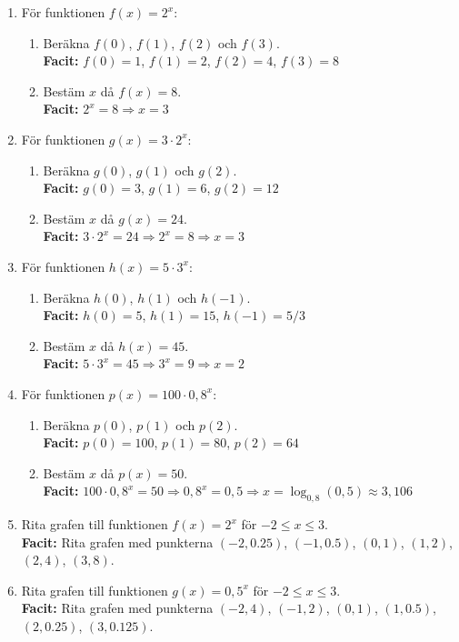 \documentclass[a4paper,11pt]{article}
\begin{document}
\begin{enumerate}[label=\textbf{\arabic*.}]
    \item För funktionen $f(x) = 2^x$:
    \begin{enumerate}[label=\alph*)]
        \item Beräkna $f(0)$, $f(1)$, $f(2)$ och $f(3)$.
        \\ \textbf{Facit:} $f(0)=1$, $f(1)=2$, $f(2)=4$, $f(3)=8$
        \item Bestäm $x$ då $f(x) = 8$.
        \\ \textbf{Facit:} $2^x=8 \Rightarrow x=3$
    \end{enumerate}
    
    \item För funktionen $g(x) = 3 \cdot 2^x$:
    \begin{enumerate}[label=\alph*)]
        \item Beräkna $g(0)$, $g(1)$ och $g(2)$.
        \\ \textbf{Facit:} $g(0)=3$, $g(1)=6$, $g(2)=12$
        \item Bestäm $x$ då $g(x) = 24$.
        \\ \textbf{Facit:} $3\cdot2^x=24 \Rightarrow 2^x=8 \Rightarrow x=3$
    \end{enumerate}
    
    \item För funktionen $h(x) = 5 \cdot 3^x$:
    \begin{enumerate}[label=\alph*)]
        \item Beräkna $h(0)$, $h(1)$ och $h(-1)$.
        \\ \textbf{Facit:} $h(0)=5$, $h(1)=15$, $h(-1)=5/3$
        \item Bestäm $x$ då $h(x) = 45$.
        \\ \textbf{Facit:} $5\cdot3^x=45 \Rightarrow 3^x=9 \Rightarrow x=2$
    \end{enumerate}
    
    \item För funktionen $p(x) = 100 \cdot 0,8^x$:
    \begin{enumerate}[label=\alph*)]
        \item Beräkna $p(0)$, $p(1)$ och $p(2)$.
        \\ \textbf{Facit:} $p(0)=100$, $p(1)=80$, $p(2)=64$
        \item Bestäm $x$ då $p(x) = 50$.
        \\ \textbf{Facit:} $100\cdot0,8^x=50 \Rightarrow 0,8^x=0,5 \Rightarrow x=\log_{0,8}(0,5) \approx 3,106$
    \end{enumerate}
    
    \item Rita grafen till funktionen $f(x) = 2^x$ för $-2 \leq x \leq 3$.
    \\ \textbf{Facit:} Rita grafen med punkterna $(-2,0.25)$, $(-1,0.5)$, $(0,1)$, $(1,2)$, $(2,4)$, $(3,8)$.
    
    \item Rita grafen till funktionen $g(x) = 0,5^x$ för $-2 \leq x \leq 3$.
    \\ \textbf{Facit:} Rita grafen med punkterna $(-2,4)$, $(-1,2)$, $(0,1)$, $(1,0.5)$, $(2,0.25)$, $(3,0.125)$.
\end{enumerate}
\end{document}
